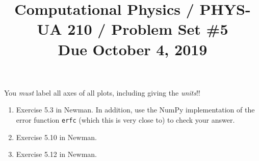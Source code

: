 \documentclass[11pt, preprint]{aastex}
\begin{document}
\title{\bf Computational Physics / PHYS-UA 210 / Problem Set \#5
\\ Due October 4, 2019 }

You {\it must} label all axes of all plots, including giving the {\it
  units}!!

\begin{enumerate}
  \item Exercise 5.3 in Newman. In addition, use the NumPy
    implementation of the error function {\tt erfc} (which this is
    very close to) to check your answer.
  \item Exercise 5.10 in Newman. 
  \item Exercise 5.12 in Newman. 
\end{enumerate}
\end{document}
